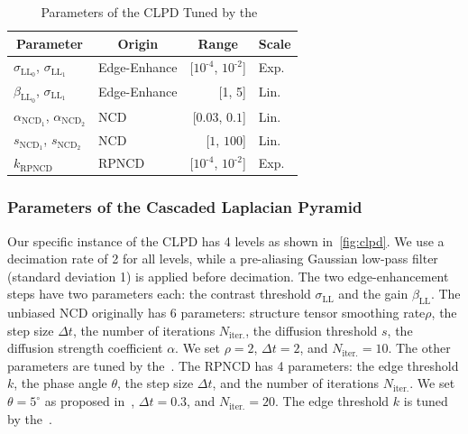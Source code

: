 \begin{table}
  \centering
  \caption{Parameters of the CLPD Tuned by the~\usdg}\label{table:params}
  \begin{threeparttable}
  \begin{tabular}{llrl}
    \toprule
    \multicolumn{1}{c}{\textbf{Parameter}}
    & \multicolumn{1}{c}{\textbf{Origin}}
    & \multicolumn{1}{c}{\textbf{Range}}
    & \multicolumn{1}{c}{\textbf{Scale}}
    \\ \midrule
    \(\sigma_{\mathrm{LL}_0}\), \(\sigma_{\mathrm{LL}_1}\)  & Edge-Enhance & [\(10^{\text{-}4}\), \(10^{\text{-}2}\)] & Exp.  \\
    \(\beta_{\mathrm{LL}_0}\), \(\sigma_{\mathrm{LL}_1}\)   & Edge-Enhance & [1, 5]                   & Lin. \\
    \(\alpha_{\mathrm{NCD}_1}\), \(\alpha_{\mathrm{NCD}_2}\) & NCD          & [\(0.03\), \(0.1\)]     & Lin.  \\
    \(s_{\mathrm{NCD}_1}\), \(s_{\mathrm{NCD}_2}\)           & NCD          & [\(1\), \(100\)]        & Lin. \\
    \(k_{\text{RPNCD}}\)                                & RPNCD        & [\(10^{\text{-}4}\), \(10^{\text{-}2}\)] & Exp. \\\bottomrule
  \end{tabular}
  \end{threeparttable}
\end{table}
%
\subsubsection{Parameters of the Cascaded Laplacian Pyramid}
Our specific instance of the CLPD has 4 levels as shown in~\cref{fig:clpd}.
We use a decimation rate of 2 for all levels, while a pre-aliasing Gaussian low-pass filter (standard deviation 1) is applied before decimation.
The two edge-enhancement steps have two parameters each: the contrast threshold \(\sigma_{\mathrm{LL}}\) and the gain \(\beta_{\mathrm{LL}}\).
The unbiased NCD originally has 6 parameters: structure tensor smoothing rate\(\rho\), the step size \(\Delta t\), the number of iterations \(N_{\text{iter.}}\), the diffusion threshold \(s\), the diffusion strength coefficient \(\alpha\).
We set \(\rho = 2\), \(\Delta t = 2\), and \(N_{\text{iter.}} = 10\).
The other parameters are tuned by the~\usdg.
The RPNCD has 4 parameters: the edge threshold \(k\), the phase angle \(\theta\), the step size \(\Delta t\), and the number of iterations \(N_{\text{iter.}}\).
We set \(\theta = 5^{\circ}\) as proposed in~\cite{gilboa_image_2004}, \(\Delta t = 0.3\), and \(N_{\text{iter.}} = 20\).
The edge threshold \(k\) is tuned by the~\usdg.

